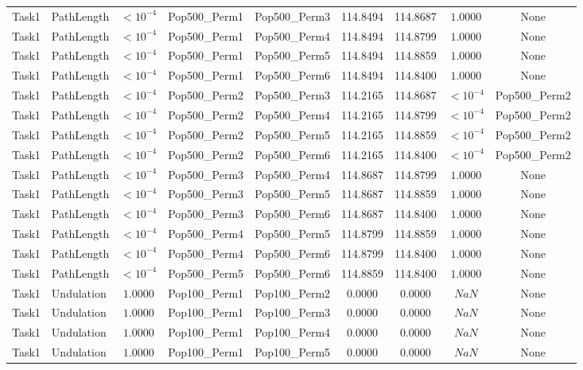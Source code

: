 \documentclass[8pt]{article}
\begin{document}
\begin{longtable}{llccccccc}
Task1 & PathLength & $< 10^{-4}$ & Pop500\_Perm1 & Pop500\_Perm3 & 114.8494 & 114.8687 & $1.0000$ & None \\
Task1 & PathLength & $< 10^{-4}$ & Pop500\_Perm1 & Pop500\_Perm4 & 114.8494 & 114.8799 & $1.0000$ & None \\
Task1 & PathLength & $< 10^{-4}$ & Pop500\_Perm1 & Pop500\_Perm5 & 114.8494 & 114.8859 & $1.0000$ & None \\
Task1 & PathLength & $< 10^{-4}$ & Pop500\_Perm1 & Pop500\_Perm6 & 114.8494 & 114.8400 & $1.0000$ & None \\
Task1 & PathLength & $< 10^{-4}$ & Pop500\_Perm2 & Pop500\_Perm3 & 114.2165 & 114.8687 & $< 10^{-4}$ & Pop500\_Perm2 \\
Task1 & PathLength & $< 10^{-4}$ & Pop500\_Perm2 & Pop500\_Perm4 & 114.2165 & 114.8799 & $< 10^{-4}$ & Pop500\_Perm2 \\
Task1 & PathLength & $< 10^{-4}$ & Pop500\_Perm2 & Pop500\_Perm5 & 114.2165 & 114.8859 & $< 10^{-4}$ & Pop500\_Perm2 \\
Task1 & PathLength & $< 10^{-4}$ & Pop500\_Perm2 & Pop500\_Perm6 & 114.2165 & 114.8400 & $< 10^{-4}$ & Pop500\_Perm2 \\
Task1 & PathLength & $< 10^{-4}$ & Pop500\_Perm3 & Pop500\_Perm4 & 114.8687 & 114.8799 & $1.0000$ & None \\
Task1 & PathLength & $< 10^{-4}$ & Pop500\_Perm3 & Pop500\_Perm5 & 114.8687 & 114.8859 & $1.0000$ & None \\
Task1 & PathLength & $< 10^{-4}$ & Pop500\_Perm3 & Pop500\_Perm6 & 114.8687 & 114.8400 & $1.0000$ & None \\
Task1 & PathLength & $< 10^{-4}$ & Pop500\_Perm4 & Pop500\_Perm5 & 114.8799 & 114.8859 & $1.0000$ & None \\
Task1 & PathLength & $< 10^{-4}$ & Pop500\_Perm4 & Pop500\_Perm6 & 114.8799 & 114.8400 & $1.0000$ & None \\
Task1 & PathLength & $< 10^{-4}$ & Pop500\_Perm5 & Pop500\_Perm6 & 114.8859 & 114.8400 & $1.0000$ & None \\
Task1 & Undulation & $1.0000$ & Pop100\_Perm1 & Pop100\_Perm2 & 0.0000 & 0.0000 & $NaN$ & None \\
Task1 & Undulation & $1.0000$ & Pop100\_Perm1 & Pop100\_Perm3 & 0.0000 & 0.0000 & $NaN$ & None \\
Task1 & Undulation & $1.0000$ & Pop100\_Perm1 & Pop100\_Perm4 & 0.0000 & 0.0000 & $NaN$ & None \\
Task1 & Undulation & $1.0000$ & Pop100\_Perm1 & Pop100\_Perm5 & 0.0000 & 0.0000 & $NaN$ & None \\

\end{longtable}
\end{document}
